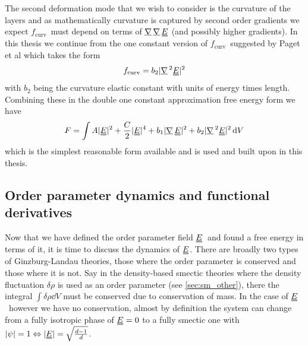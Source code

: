 \documentclass[12pt]{article}
\newcommand{\suf}[2]{\stackunder[0.5pt]{\stackunder[1pt]{\ensuremath{#1}}{\rule{\widthof{\ensuremath{#2}}*\real{0.9}}{.1ex}}}{}}
\newcommand{\duf}[2]{\stackunder[0.5pt]{\stackunder[0.8pt]{\stackunder[1pt]{\ensuremath{#1}}{\rule{\widthof{\ensuremath{#2}}*\real{0.9}}{.1ex}}}{\rule{\widthof{\ensuremath{#2}}*\real{0.9}}{.1ex}}}{}}
\newcommand{\du}[1]{\duf{#1}{#1}}
\newcommand{\mgrad}{\ensuremath{\suf{\nabla}{K}\,}}
\newcommand{\EE}{\ensuremath{\du{E}}}
\newcommand{\FU}{\ensuremath{f_\text{curv}}}
\begin{document}
        The second deformation mode that we wish to consider is the curvature of the layers and as mathematically curvature is captured by second order gradients we expect \FU\ must depend on terms of $\mgrad\mgrad\EE$ (and possibly higher gradients).
        In this thesis we continue from the one constant version of \FU\ suggested by Paget et al which takes the form
        \begin{equation}
            \FU = b_2 |\mgrad^2 \EE|^2
        \end{equation}
        with $b_2$ being the curvature elastic constant with units of energy times length.
        Combining these in the double one constant approximation free energy form we have
        \begin{equation}\label{eq:Foca}
            F = \int A |\du{E}|^2 + \frac{C}{2}|\du{E}|^4 + b_1 |\mgrad \EE|^2 + b_2 |\mgrad^2 \EE|^2 \dd{V}
        \end{equation}
        which is the simplest reasonable form available and is used and built upon in this thesis.

    \subsection{Order parameter dynamics and functional derivatives}
        Now that we have defined the order parameter field \EE\ and found a free energy in terms of it, it is time to discuss the dynamics of \EE.
        There are broadly two types of Ginzburg-Landau theories, those where the order parameter is conserved and those where it is not.
        Say in the density-based smectic theories where the density fluctuation $\delta\rho$ is used as an order parameter (see \cref{sec:sm_other}), there the integral $\int \delta\rho \dd{V}$ must be conserved due to conservation of mass.
        In the case of \EE\ however we have no conservation, almost by definition the system can change from a fully isotropic phase of $\EE=0$ to a fully smectic one with $|\psi|=1 \Leftrightarrow |\EE| = \sqrt{\frac{d-1}{d}}$.
\end{document}

